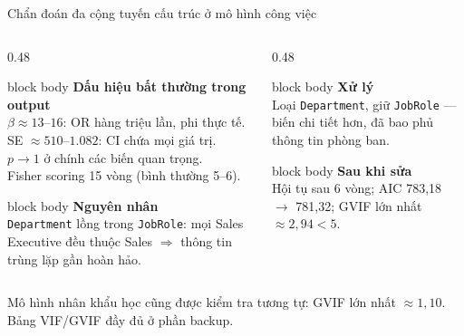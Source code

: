 \documentclass[10pt,aspectratio=169]{beamer}
\begin{document}
\begin{frame}{Chẩn đoán đa cộng tuyến cấu trúc ở mô hình công việc}
  \begin{columns}[T,onlytextwidth]
    \begin{column}{0.48\textwidth}
      \begin{beamercolorbox}[sep=0.16cm,rounded=true]{block body}
        \textbf{\color{HCMUSRed}Dấu hiệu bất thường trong output}\\[0.04cm]
        \small
        $\beta \approx 13$--$16$: OR hàng triệu lần, phi thực tế.\\
        SE $\approx 510$--$1.082$: CI chứa mọi giá trị.\\
        $p \to 1$ ở chính các biến quan trọng.\\
        Fisher scoring 15 vòng (bình thường 5--6).
      \end{beamercolorbox}
      \vspace{0.16cm}
      \begin{beamercolorbox}[sep=0.16cm,rounded=true]{block body}
        \textbf{Nguyên nhân}\\[0.04cm]
        \small
        \texttt{Department} lồng trong \texttt{JobRole}:
        mọi Sales Executive đều thuộc Sales
        $\Rightarrow$ thông tin trùng lặp gần hoàn hảo.
      \end{beamercolorbox}
    \end{column}
    \begin{column}{0.48\textwidth}
      \begin{beamercolorbox}[sep=0.16cm,rounded=true]{block body}
        \textbf{\color{HCMUSGreen}Xử lý}\\[0.04cm]
        \small
        Loại \texttt{Department}, giữ \texttt{JobRole}
        --- biến chi tiết hơn, đã bao phủ thông tin phòng ban.
      \end{beamercolorbox}
      \vspace{0.16cm}
      \begin{beamercolorbox}[sep=0.16cm,rounded=true]{block body}
        \textbf{Sau khi sửa}\\[0.04cm]
        \small
        Hội tụ sau 6 vòng; AIC 783,18 $\to$ 781,32;
        GVIF lớn nhất $\approx 2{,}94 < 5$.
      \end{beamercolorbox}
    \end{column}
  \end{columns}
  \vspace{0.18cm}
  {\scriptsize\color{MutedText}
   Mô hình nhân khẩu học cũng được kiểm tra tương tự: GVIF lớn nhất
   $\approx 1{,}10$. Bảng VIF/GVIF đầy đủ ở phần backup.}
\end{frame}
\end{document}
